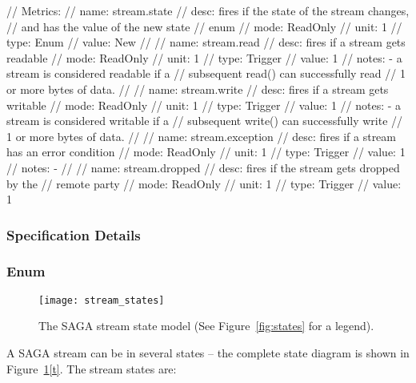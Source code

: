 \begin{myspec}
{{ 
      // Metrics:
      //   name:  stream.state
      //   desc:  fires if the state of the stream changes,
      //          and has the value of the new state
      //          enum
      //   mode:  ReadOnly
      //   unit:  1
      //   type:  Enum
      //   value: New
      //
      //   name:  stream.read
      //   desc:  fires if a stream gets readable
      //   mode:  ReadOnly
      //   unit:  1
      //   type:  Trigger
      //   value: 1
      //   notes: - a stream is considered readable if a
      //            subsequent read() can successfully read 
      //            1 or more bytes of data.
      //
      //   name:  stream.write
      //   desc:  fires if a stream gets writable
      //   mode:  ReadOnly
      //   unit:  1
      //   type:  Trigger
      //   value: 1
      //   notes: - a stream is considered writable if a
      //            subsequent write() can successfully write
      //            1 or more bytes of data.
      //
      //   name:  stream.exception
      //   desc:  fires if a stream has an error condition
      //   mode:  ReadOnly
      //   unit:  1
      //   type:  Trigger
      //   value: 1
      //   notes: - 
      //
      //   name:  stream.dropped
      //   desc:  fires if the stream gets dropped by the
      //          remote party
      //   mode:  ReadOnly
      //   unit:  1
      //   type:  Trigger
      //   value: 1
    }
  }
 \end{myspec}
 
 
 \subsubsection{Specification Details}
 
  \subsubsection*{Enum }
  \label{t}
 
  \begin{figure}[!ht]
    \begin{center}
      \texttt{[image: stream\_states]}
      \caption{\label{fig:stream_states} \footnotesize The SAGA stream state model
      (See Figure~\ref{fig:states} for a legend).}
    \end{center}
  \end{figure}
 
   A SAGA  stream can be in several states -- the complete state
   diagram is shown in Figure~\ref{fig:stream_states}\ref{t}.  The
   stream states are:
 

